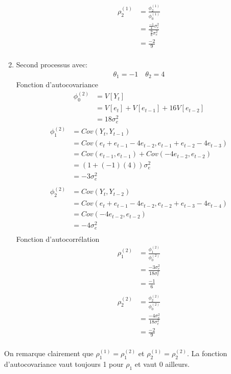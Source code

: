 \begin{solution}{2.5}
\begin{enumerate}
\begin{align*}
\rho_2^{(1)} &= \frac{\phi_2^{(1)}}{\phi_0^{(1)}} \\
&= \frac{\frac{-1}{4}\sigma^2_e}{\frac{9}{8}\sigma^2_e} \\
&= \frac{-2}{9} \\
\end{align*}
\item Second processus avec:
\begin{align*}
\theta_1 = -1 \quad \theta_2 = 4
\end{align*}
Fonction d'autocovariance
\begin{align*}
\phi_0^{(2)} &= V[Y_t] \\
&= V[e_t]+V[e_{t-1}]+16V[e_{t-2}] \\
&= 18 \sigma^2_e
\end{align*}
\begin{align*}
\phi_1^{(2)} &= Cov(Y_t,Y_{t-1}) \\
&= Cov(e_t + e_{t-1} - 4e_{t-2}, e_{t-1} + e_{t-2} - 4e_{t-3}) \\
&= Cov(e_{t-1},e_{t-1}) + Cov(-4e_{t-2},e_{t-2}) \\
&= (1 + (-1)(4))\sigma^2_e \\
&= -3\sigma^2_e \\
\end{align*}
\begin{align*}
\phi_2^{(2)} &= Cov(Y_t,Y_{t-2}) \\
&= Cov(e_t + e_{t-1} - 4e_{t-2}, e_{t-2} + e_{t-3} - 4e_{t-4} )\\
&= Cov(- 4e_{t-2},e_{t-2}) \\
&= -4\sigma^2_e \\
\end{align*}
Fonction d'autocorrélation
\begin{align*}
\rho_1^{(2)} &= \frac{\phi_1^{(2)}}{\phi_0^{(2)}} \\
&= \frac{-3\sigma^2_e}{18\sigma^2_e} \\
&= \frac{-1}{6} \\
\end{align*}
\begin{align*}
\rho_2^{(2)} &= \frac{\phi_2^{(2)}}{\phi_0^{(2)}} \\
&= \frac{-4\sigma^2_e}{18\sigma^2_e} \\
&= \frac{-2}{9} \\
\end{align*}
\end{enumerate}

On remarque clairement que $\rho_1^{(1)} = \rho_1^{(2)}$ et $\rho_2^{(1)} = \rho_2^{(2)}$.
La fonction d'autocovariance vaut toujours 1 pour $\rho_1$ et vaut 0 ailleurs.
  
\end{solution}
